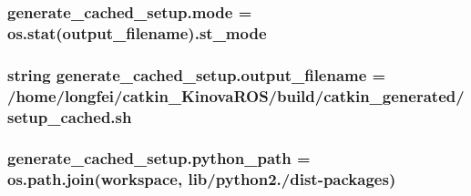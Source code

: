 \subsubsection[{\texorpdfstring{mode}{mode}}]{\setlength{\rightskip}{0pt plus 5cm}generate\+\_\+cached\+\_\+setup.\+mode = os.\+stat({\bf output\+\_\+filename}).st\+\_\+mode}\hypertarget{namespacegenerate__cached__setup_a10081e5abedae9bd46dd91202096e789}{}\label{namespacegenerate__cached__setup_a10081e5abedae9bd46dd91202096e789}
\subsubsection[{\texorpdfstring{output\+\_\+filename}{output_filename}}]{\setlength{\rightskip}{0pt plus 5cm}string generate\+\_\+cached\+\_\+setup.\+output\+\_\+filename = \textquotesingle{}/home/longfei/catkin\+\_\+\+Kinova\+R\+OS/build/catkin\+\_\+generated/setup\+\_\+cached.\+sh\textquotesingle{}}\hypertarget{namespacegenerate__cached__setup_a0265aee5075ee1eb701ff69c98ad6793}{}\label{namespacegenerate__cached__setup_a0265aee5075ee1eb701ff69c98ad6793}
\subsubsection[{\texorpdfstring{python\+\_\+path}{python_path}}]{\setlength{\rightskip}{0pt plus 5cm}generate\+\_\+cached\+\_\+setup.\+python\+\_\+path = os.\+path.\+join(workspace, \textquotesingle{}lib/python2./dist-\/packages\textquotesingle{})}\hypertarget{namespacegenerate__cached__setup_a72579fd01529a79bab20d99291889d3f}{}\label{namespacegenerate__cached__setup_a72579fd01529a79bab20d99291889d3f}
